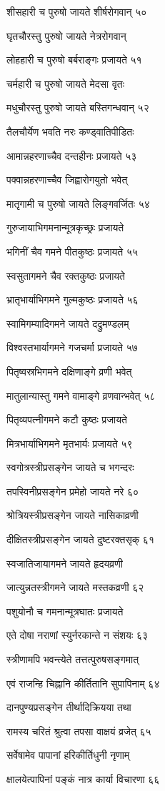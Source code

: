 शीसहारी च पुरुषो जायते शीर्षरोगवान् ५०

घृतचौरस्तु पुरुषो जायते नेत्ररोगवान्

लोहहारी च पुरुषो बर्बराङ्गः प्रजायते ५१

चर्महारी च पुरुषो जायते मेदसा वृतः

मधुचौरस्तु पुरुषो जायते बस्तिगन्धवान् ५२

तैलचौर्येण भवति नरः कण्ड्वातिपीडितः

आमान्नहरणाच्चैव दन्तहीनः प्रजायते ५३

पक्वान्नहरणाच्चैव जिह्वारोगयुतो भवेत्

मातृगामी च पुरुषो जायते लिङ्गवर्जितः ५४

गुरुजायाभिगमनान्मूत्रकृच्छ्रः प्रजायते

भगिनीं चैव गमने पीतकुष्ठः प्रजायते ५५

स्वसुतागमने चैव रक्तकुष्ठः प्रजायते

भ्रातृभार्याभिगमने गुल्मकुष्ठः प्रजायते ५६

स्वामिगम्यादिगमने जायते दद्रुमण्डलम्

विश्वस्तभार्यागमने गजचर्मा प्रजायते ५७

पितृष्वस्रभिगमने दक्षिणाङ्गे व्रणी भवेत्

मातुलान्यास्तु गमने वामाङ्गे व्रणवान्भवेत् ५८

पितृव्यपत्नीगमने कटौ कुष्ठः प्रजायते

मित्रभार्याभिगमने मृतभार्यः प्रजायते ५९

स्वगोत्रस्त्रीप्रसङ्गेन जायते च भगन्दरः

तपस्विनीप्रसङ्गेन प्रमेहो जायते नरे ६०

श्रोत्रियस्त्रीप्रसङ्गेन जायते नासिकाव्रणी

दीक्षितस्त्रीप्रसङ्गेन जायते दुष्टरक्तसृक् ६१

स्वजातिजायागमने जायते हृदयव्रणी

जात्युन्नतस्त्रीगमने जायते मस्तकव्रणी ६२

पशुयोनौ च गमनान्मूत्रघातः प्रजायते

एते दोषा नराणां स्युर्नरकान्ते न संशयः ६३

स्त्रीणामपि भवन्त्येते तत्तत्पुरुषसङ्गमात्

एवं राजन्हि चिह्नानि कीर्तितानि सुपापिनाम् ६४

दानपुण्यप्रसङ्गेन तीर्थादिक्रियया तथा

रामस्य चरितं श्रुत्वा तपसा वाक्षयं व्रजेत् ६५

सर्वेषामेव पापानां हरिकीर्तिधुनी नृणाम्

क्षालयेत्पापिनां पङ्कं नात्र कार्या विचारणा ६६

